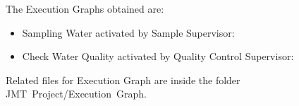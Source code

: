 \newpage

The Execution Graphs obtained are:

\begin{itemize}
\item Sampling Water activated by Sample Supervisor:
	\bigskip
	\bigskip
	\begin{center}
	\end{center}
	\bigskip
\newpage
\item Check Water Quality activated by Quality Control Supervisor:
	\bigskip
	\bigskip
	\bigskip
	\bigskip
	\begin{center}
	\end{center}
	\bigskip
\end{itemize}

Related files for Execution Graph are inside the folder JMT\ Project/Execution\ Graph.
